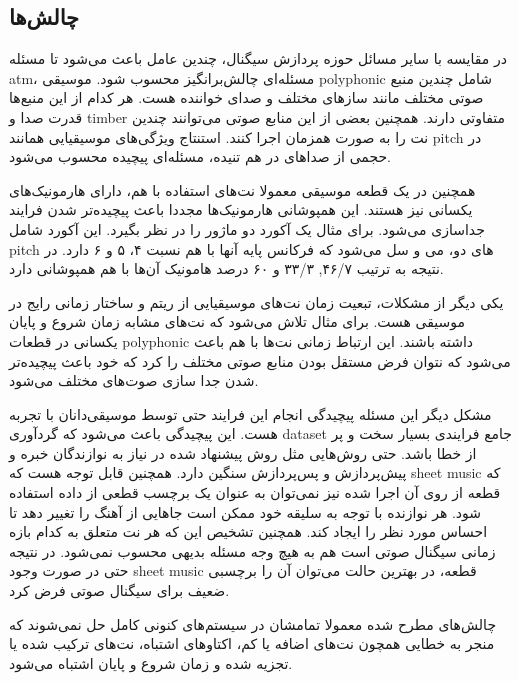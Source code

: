 \subsection{چالش‌ها}
در مقایسه با سایر مسائل حوزه پردازش سیگنال، چندین عامل باعث می‌شود تا مسئله
\gls{atm}، مسئله‌ای چالش‌برانگیز محسوب شود. موسیقی \gls{polyphonic} شامل چندین
منبع صوتی مختلف مانند ساز‌های مختلف و صدای خواننده هست. هر کدام از این منبع‌ها
قدرت صدا و \gls{timber} متفاوتی دارند. همچنین بعضی از این منابع صوتی می‌توانند
چندین نت را به صورت همزمان اجرا کنند. استنتاج ویژگی‌های موسیقیایی همانند
\gls{pitch} در حجمی از صداهای در هم تنیده، مسئله‌ای پیچیده محسوب می‌شود.

همچنین در یک قطعه موسیقی معمولا نت‌های استفاده با هم، دارای هارمونیک‌های یکسانی
نیز هستند. این همپوشانی هارمونیک‌ها مجددا باعث پیچیده‌تر شدن فرایند جداسازی
می‌شود. برای مثال یک آکورد دو ماژور را در نظر بگیرد. این آکورد شامل \gls{pitch}
های دو، می و سل می‌شود که فرکانس پایه آنها با هم نسبت ۴، ۵ و ۶ دارد. در نتیجه به
ترتیب ۴۶/۷, ۳۳/۳ و ۶۰ درصد هامونیک آن‌ها با هم همپوشانی دارد.

یکی دیگر از مشکلات، تبعیت زمان نت‌های موسیقیایی از ریتم و ساختار زمانی رایج در
موسیقی هست. برای مثال تلاش می‌شود که نت‌های مشابه زمان شروع و پایان یکسانی در
قطعات \gls{polyphonic} داشته باشند. این ارتباط زمانی نت‌ها با هم باعث می‌شود که
نتوان فرض مستقل بودن منابع صوتی مختلف را کرد که خود باعث پیچیده‌تر شدن جدا سازی
صوت‌های مختلف می‌شود.

مشکل دیگر این مسئله پیچیدگی انجام این فرایند حتی توسط موسیقی‌دانان با تجربه هست.
این پیچیدگی باعث می‌شود که گردآوری \gls{dataset} جامع فرایندی بسیار سخت و پر از
خطا باشد. حتی روش‌هایی مثل روش پیشنهاد شده در \cite{su2015escaping} نیاز به
نوازندگان خبره و پیش‌پردازش و پس‌پردازش سنگین دارد. همچنین قابل توجه هست که
\gls{sheet music} که قطعه از روی آن اجرا شده نیز نمی‌توان به عنوان یک برچسب قطعی
از داده استفاده شود. هر نوازنده با توجه به سلیقه خود ممکن است جاهایی از آهنگ را
تغییر دهد تا احساس مورد نظر را ایجاد کند. همچنین تشخیص این که هر نت متعلق به
کدام بازه زمانی سیگنال صوتی است هم به هیچ وجه مسئله‌ بدیهی محسوب نمی‌شود. در
نتیجه حتی در صورت وجود \gls{sheet music} قطعه، در بهترین حالت می‌توان آن را
برچسبی ضعیف برای سیگنال صوتی فرض کرد.

چالش‌های مطرح شده معمولا تمامشان در سیستم‌های کنونی کامل حل نمی‌شوند که منجر به
خطایی همچون نت‌های اضافه یا کم، اکتاوهای اشتباه، نت‌های ترکیب شده یا تجزیه شده و
زمان شروع و پایان اشتباه می‌شود.